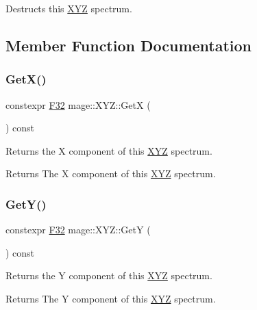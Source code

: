 Destructs this \mbox{\hyperlink{structmage_1_1_x_y_z}{X\+YZ}} spectrum. 

\subsection{Member Function Documentation}
\mbox{\label{structmage_1_1_x_y_z_ad11318d8920b1782b07c4ac30d4c0204}} 
\subsubsection{\texorpdfstring{Get\+X()}{GetX()}}
{\footnotesize\ttfamily constexpr \mbox{\hyperlink{namespacemage_aa97e833b45f06d60a0a9c4fc22ae02c0}{F32}} mage\+::\+X\+Y\+Z\+::\+GetX (\begin{DoxyParamCaption}{ }\end{DoxyParamCaption}) const\hspace{0.3cm}{\ttfamily [noexcept]}}

Returns the X component of this \mbox{\hyperlink{structmage_1_1_x_y_z}{X\+YZ}} spectrum.

\begin{DoxyReturn}{Returns}
The X component of this \mbox{\hyperlink{structmage_1_1_x_y_z}{X\+YZ}} spectrum. 
\end{DoxyReturn}
\mbox{\label{structmage_1_1_x_y_z_a62c071fb7aa64b393fdb6088207df149}} 
\subsubsection{\texorpdfstring{Get\+Y()}{GetY()}}
{\footnotesize\ttfamily constexpr \mbox{\hyperlink{namespacemage_aa97e833b45f06d60a0a9c4fc22ae02c0}{F32}} mage\+::\+X\+Y\+Z\+::\+GetY (\begin{DoxyParamCaption}{ }\end{DoxyParamCaption}) const\hspace{0.3cm}{\ttfamily [noexcept]}}

Returns the Y component of this \mbox{\hyperlink{structmage_1_1_x_y_z}{X\+YZ}} spectrum.

\begin{DoxyReturn}{Returns}
The Y component of this \mbox{\hyperlink{structmage_1_1_x_y_z}{X\+YZ}} spectrum. 
\end{DoxyReturn}
\mbox{\label{structmage_1_1_x_y_z_a2bb3aba163d325ebb844d26d240edcc9}} 
